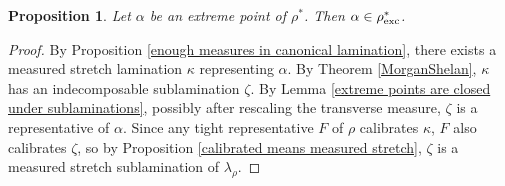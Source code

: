 \documentclass[reqno,11pt]{amsart}
\newtheorem{proposition}[theorem]{Proposition}
\theoremstyle{definition}
\numberwithin{equation}{section}
\begin{document}
\begin{proposition}\label{extreme points are indecomposable}
Let $\alpha$ be an extreme point of $\rho^*$. Then $\alpha \in \rho^*_{\rm exc}$.
\end{proposition}
\begin{proof}
By Proposition \ref{enough measures in canonical lamination}, there exists a measured stretch lamination $\kappa$ representing $\alpha$.
By Theorem \ref{MorganShelan}, $\kappa$ has an indecomposable sublamination $\zeta$.
By Lemma \ref{extreme points are closed under sublaminations}, possibly after rescaling the transverse measure, $\zeta$ is a representative of $\alpha$.
Since any tight representative $F$ of $\rho$ calibrates $\kappa$, $F$ also calibrates $\zeta$, so by Proposition \ref{calibrated means measured stretch}, $\zeta$ is a measured stretch sublamination of $\lambda_\rho$.
\end{proof}


\end{document}
